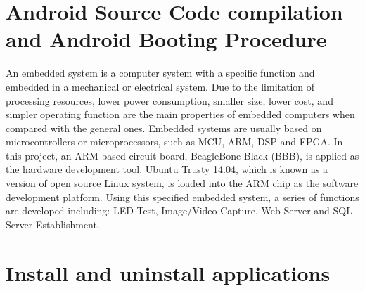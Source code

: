 \documentclass[13pt,journal,draftclsnofoot,onecolumn]{IEEEtran}
\begin{document}
\section{Android Source Code compilation and Android Booting Procedure}\label{Intro}
An embedded system is a computer system with a specific function and embedded in a mechanical or electrical system. Due to the limitation of processing resources, lower power consumption, smaller size, lower cost, and simpler operating function are the main properties of embedded computers when compared with the general ones. Embedded systems are usually based on microcontrollers or microprocessors, such as MCU, ARM, DSP and FPGA. In this project, an ARM based circuit board, BeagleBone Black (BBB), is applied as the hardware development tool. Ubuntu Trusty 14.04, which is known as a version of open source Linux system, is loaded into the ARM chip as the software development platform. Using this specified embedded system, a series of functions are developed including: LED Test, Image/Video Capture, Web Server and SQL Server Establishment.


\section{Install and uninstall applications}\label{HdDes}
\end{document}
